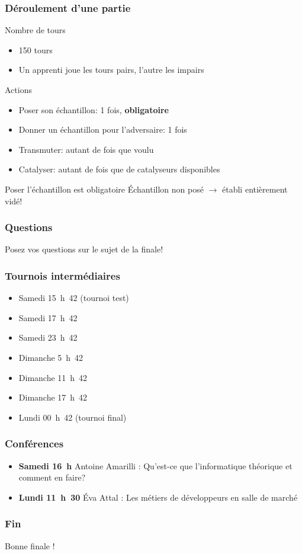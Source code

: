 \documentclass{beamer}
\begin{document}
\begin{frame}
    \frametitle{Déroulement d’une partie}
    \begin{block}{Nombre de tours}
        \begin{itemize}
            \item 150 tours
            \item Un apprenti joue les tours pairs, l'autre les impairs
        \end{itemize}
    \end{block}
    \begin{block}{Actions}
        \begin{itemize}
            \item Poser son échantillon: 1 fois, \textbf{obligatoire}
            \item Donner un échantillon pour l'adversaire: 1 fois
            \item Transmuter: autant de fois que voulu
            \item Catalyser: autant de fois que de catalyseurs disponibles
        \end{itemize}
    \end{block}
    \begin{alertblock}{Poser l'échantillon est obligatoire}
        Échantillon non posé $\rightarrow$ établi entièrement vidé!
    \end{alertblock}
\end{frame}

\begin{frame}
    \frametitle{Questions}
    Posez vos questions sur le sujet de la finale!
\end{frame}

\begin{frame}
    \frametitle{Tournois intermédiaires}
    \begin{itemize}
        \item Samedi 15~h~42 (tournoi test)
        \item Samedi 17~h~42
        \item Samedi 23~h~42
        \item Dimanche 5~h~42
        \item Dimanche 11~h~42
        \item Dimanche 17~h~42
        \item Lundi 00~h~42 (tournoi final)
    \end{itemize}
\end{frame}

\begin{frame}
    \frametitle{Conférences}
    \begin{itemize}
        \item \textbf{Samedi 16~h} Antoine Amarilli : Qu'est-ce que
            l'informatique théorique et comment en faire?
        \item \textbf{Lundi 11~h~30} Éva Attal : Les métiers de développeurs en
            salle de marché
    \end{itemize}
\end{frame}

\begin{frame}
    \frametitle{Fin}
    Bonne finale !
\end{frame}
\end{document}
